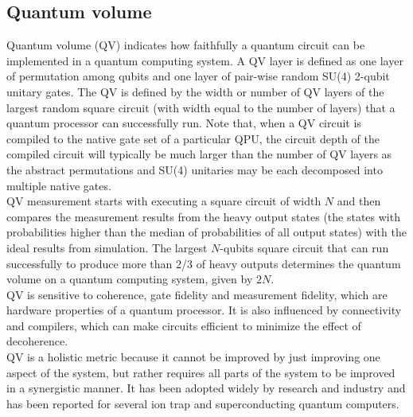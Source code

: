 \subsection{Quantum volume}
Quantum volume (QV) indicates how faithfully a quantum circuit can be implemented in a quantum computing system. A QV layer is defined as one layer of permutation among qubits and one layer of pair-wise random SU(4) 2-qubit unitary gates. The QV is defined by the width or number of QV layers of the largest random square circuit (with width equal to the number of layers) that a quantum processor can successfully run. Note that, when a QV circuit is compiled to the native gate set of a particular QPU, the circuit depth of the compiled circuit will typically be much larger than the number of QV layers as the abstract permutations and SU(4) unitaries may be each decomposed into multiple native gates. \\
QV measurement starts with executing a square circuit of width $N$ and then compares the measurement results from the heavy output states (the states with probabilities higher than the median of probabilities of all output states) with the ideal results from simulation. The largest $N$-qubits square circuit that can run successfully to produce more than 2/3 of heavy outputs determines the quantum volume on a quantum computing system, given by $2N$. \\
QV is sensitive to coherence, gate fidelity and measurement fidelity, which are hardware properties of a quantum processor. It is also influenced by connectivity and compilers, which can make circuits efficient to minimize the effect of decoherence. \\
QV is a holistic metric because it cannot be improved by just improving one aspect of the system, but rather requires all parts of the system to be improved in a synergistic manner. It has been adopted widely by research and industry and has been reported for several ion trap and superconducting quantum computers.

